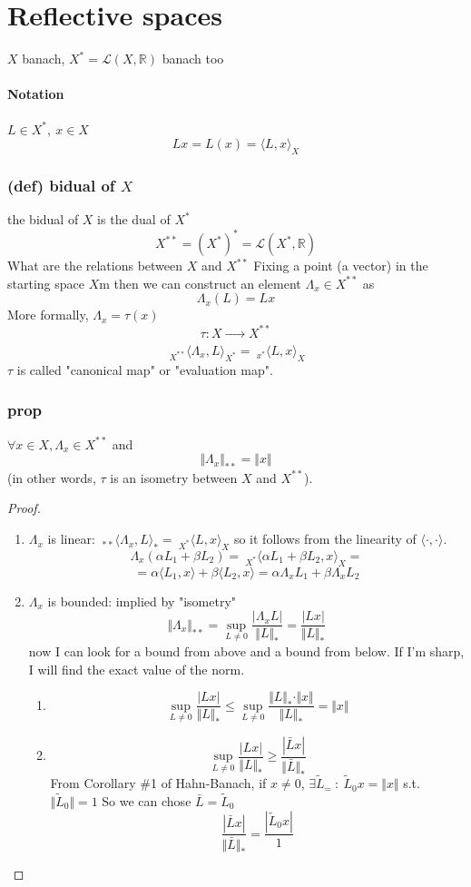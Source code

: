 \section{Reflective spaces}
$X$ banach, $X^*=\mathcal L(X,\mathbb R)$ banach too
\paragraph{Notation} $L\in X^*, \ x\in X$
$$Lx=L(x)=\langle L,x\rangle_X$$

\subsubsection{(def) bidual of $X$}
the bidual of $X$ is the dual of $X^*$
$$X^{**}=(X^*)^*=\mathcal L(X^*,\mathbb R)$$
What are the relations between $X$ and $X^{**}$
Fixing a point (a vector) in the starting space $X$m then we can construct an element $\Lambda_x\in X^{**}$ as $$\Lambda_x(L)=Lx$$
More formally, $\Lambda_x=\tau(x)$
$$\tau:X\xrightarrow[\ \ \ \ \ \ \ \ \ \ ]{}X^{**}$$
$$\ _{X^{**}}\langle\Lambda_x,L\rangle_{X^*}=\ _{x^{*}}\langle L,x\rangle_{X}$$
$\tau$ is called "canonical map" or "evaluation map".
\subsubsection{prop}
$\forall x\in X, \Lambda_x\in X^{**}$ and 
$$\Vert \Lambda_x\Vert _{**}=\Vert x\Vert $$
(in other words, $\tau$ is an isometry between $X$ and $X^{**}$).
\begin{proof}\ 
    \begin{enumerate}
        \item $\Lambda_x$ is linear: $\ _{**}\langle \Lambda_x,L\rangle _*=\ _{X^*}\langle L,x\rangle_X$ so it follows from the linearity of $\langle\cdot,\cdot\rangle$.
        $$\Lambda_x(\alpha L_1+\beta L_2)=\ _{X^*}\langle \alpha L_1+\beta L_2,x\rangle_X=$$
        $$=\alpha \langle L_1,x\rangle +\beta \langle L_2,x\rangle=\alpha \Lambda_xL_1+\beta \Lambda_xL_2$$
        \item $\Lambda_x$ is bounded: implied by "isometry"
        $$\Vert \Lambda_x\Vert_{**}=\sup_{L\neq 0}\frac{|\Lambda_xL|}{\Vert L\Vert_*}=\frac{|Lx|}{\Vert L\Vert _*}$$
        now I can look for a bound from above and a bound from below. If I'm sharp, I will find the exact value of the norm.
        \begin{enumerate}
            \item $$\sup_{L\neq 0}\frac{|Lx|}{\Vert L\Vert_*}\leq \sup_{L\neq 0}\frac{\Vert L\Vert_*\cdot \Vert x\Vert}{\Vert L\Vert_*}=\Vert x\Vert$$
            \item $$\sup_{L\neq 0}\frac{|Lx|}{\Vert L\Vert_*}\geq \frac{|\bar Lx|}{\Vert \bar L \Vert_*}$$
            From Corollary \#1 of Hahn-Banach, if $x\neq 0$, $\exists \tilde L_= \ :\ \tilde L_0x=\Vert x\Vert $ s.t. $\Vert \tilde L_0\Vert =1$
            So we can chose $\bar L=\tilde L_0$
            $$\frac{|\bar Lx|}{\Vert \bar L \Vert_*}=\frac{|\tilde L_0x|}{1}$$
        \end{enumerate}
        
        
    \end{enumerate}
\end{proof}
